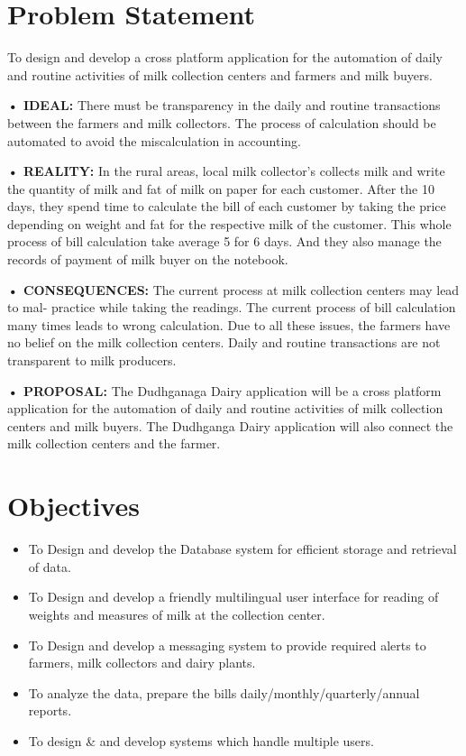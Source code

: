 \documentclass[english]{article}
\begin{document}
\clearpage
\section{Problem Statement} %
To design and develop a cross platform application for the automation of daily and routine activities of milk collection centers and farmers and milk buyers.\\
\item \textbf{• IDEAL:}
There must be transparency in the daily and routine transactions between the farmers and milk collectors. The process of calculation should be automated to avoid the miscalculation in accounting.
\item \textbf{• REALITY: }
In the rural areas, local milk collector’s collects milk and write the quantity of milk and fat of milk on paper for each customer. After the 10 days, they spend time to calculate the bill of each customer by taking the price depending on weight and fat for the respective milk of the customer. This whole process of bill calculation take average 5 for 6 days. And they also manage the records of payment of milk buyer on the notebook.
\item \textbf{• CONSEQUENCES:}
The current process at milk collection centers may lead to mal- practice while taking the readings. The current process of bill calculation many times leads to wrong calculation. Due to all these issues, the farmers have no belief on the milk collection centers. Daily and routine transactions are not transparent to milk producers.
\item \textbf{• PROPOSAL: }
The Dudhganaga Dairy application will be a cross platform application for the automation of daily and routine activities of milk collection centers and milk buyers. The Dudhganga Dairy application will also connect the milk collection centers and the farmer.




\section{Objectives} %
\begin{itemize}
\item To Design and develop the Database system for efficient storage and retrieval of data.
\item To Design and develop a friendly multilingual user interface for reading of weights and
    measures of milk at the collection center.
\item To Design and develop a messaging system to provide required alerts to farmers, milk
     collectors and dairy plants.
\item To analyze the data, prepare the bills daily/monthly/quarterly/annual reports.
\item To design & and develop systems which handle multiple users.\end{itemize}
\end{document}
